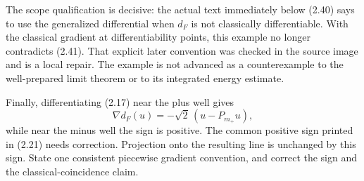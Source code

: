 \documentclass[10pt]{article}
\begin{document}
The scope qualification is decisive: the actual text immediately below (2.40) says to use the generalized differential when \(d_F\) is not classically differentiable. With the classical gradient at differentiability points, this example no longer contradicts (2.41). That explicit later convention was checked in the source image and is a local repair. The example is not advanced as a counterexample to the well-prepared limit theorem or to its integrated energy estimate.\par
Finally, differentiating (2.17) near the plus well gives \[\nabla d_F(u)=-\sqrt2\,(u-P_{m_+}u),\] while near the minus well the sign is positive. The common positive sign printed in (2.21) needs correction. Projection onto the resulting line is unchanged by this sign. State one consistent piecewise gradient convention, and correct the sign and the classical-coincidence claim.\par
\end{document}
